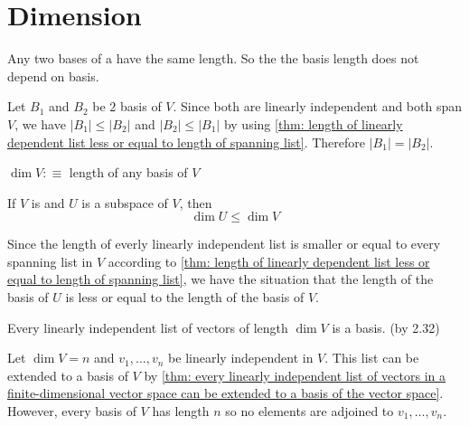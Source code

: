 \section{Dimension}

\setcounter{thm}{33}
\begin{thm}  Any two bases of a \fdvs have the same length. So the the basis length does not depend on basis.
\end{thm}
\begin{prf}
  Let $B_1$ and $B_2$ be $2$ basis of $V$. Since both are linearly independent and both span $V$, we have $|B_1| \leq |B_2|$ and $|B_2| \leq |B_1|$ by using \ref{thm: length of linearly dependent list less or equal to length of spanning list}. Therefore $|B_1|=|B_2|.$
\end{prf}

\begin{mydef} [dimension]
  $\dim V :\equiv$ length of any basis of $V$
\end{mydef}

\setcounter{thm}{36}
\begin{thm} 
  \label{thm: dimension of a subspace}
  If $V$ is \fd and $U$ is a subspace of $V$, then
  \begin{equation}
    \dim U \leq \dim V 
  \end{equation}
\end{thm}
\begin{prf}
  Since the length of everly linearly independent list is smaller or equal to every spanning list in $V$ according to
  \ref{thm: length of linearly dependent list less or equal to length of spanning list}, we have the situation that the length of the basis of $U$ is less or equal to the length of the basis of $V$.
\end{prf}


\begin{thm} 
  \label{thm: linearly independent list of the right length is a basis}
  Every linearly independent list of vectors of length $\dim V$ is a basis. (by 2.32)
\end{thm}
\begin{prf}
  Let $\dim V = n$ and $v_1, \ldots, v_n$ be linearly independent in $V$. This list can be extended to a basis of $V$ by \ref{thm: every linearly independent list of vectors in a finite-dimensional vector space can be extended to a basis of the vector space}. However, every basis of $V$ has length $n$ so no elements are adjoined to $v_1, \ldots, v_n$.
\end{prf}

